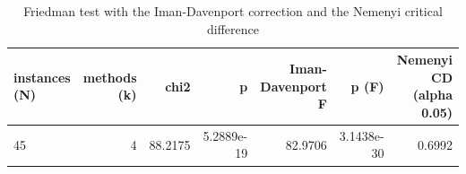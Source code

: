 \begin{table}[htbp]
\centering
\small
\caption{Friedman test with the Iman-Davenport correction and the Nemenyi critical difference}
\label{tab:E5b_ablation_60s_b60_friedman_test}
\begin{tabular}{lrrrrrr}
\toprule
instances (N) & methods (k) & chi2 & p & Iman-Davenport F & p (F) & Nemenyi CD (alpha 0.05) \\
\midrule
45 & 4 & 88.2175 & 5.2889e-19 & 82.9706 & 3.1438e-30 & 0.6992 \\
\bottomrule
\end{tabular}
\end{table}
